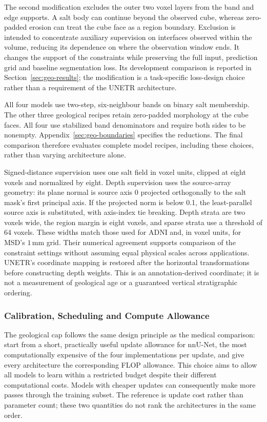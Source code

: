 \documentclass[12pt,a4paper]{article}
\begin{document}
The second modification excludes the outer two voxel layers from the
band and edge supports. A salt body can continue beyond the observed
cube, whereas zero-padded erosion can treat the cube face as a region
boundary. Exclusion is intended to concentrate auxiliary supervision
on interfaces observed within the volume, reducing its dependence on
where the observation window ends. It changes the support of the
constraints while preserving the full input, prediction grid and
baseline segmentation loss. Its development comparison is reported in
Section~\ref{sec:geo-results}; the modification is a task-specific
loss-design choice rather than a requirement of the UNETR architecture.

All four models use two-step, six-neighbour bands on binary salt
membership. The other three geological recipes retain zero-padded
morphology at the cube faces. All four use stabilized band denominators
and require both sides to be nonempty.
Appendix~\ref{sec:geo-boundaries} specifies the reductions. The final
comparison therefore evaluates complete model recipes, including these
choices, rather than varying architecture alone.

Signed-distance supervision uses one salt field in voxel units, clipped
at eight voxels and normalized by eight. Depth supervision uses the
source-array geometry: its plane normal is source axis 0 projected
orthogonally to the salt mask's first principal axis. If the projected
norm is below 0.1, the least-parallel source axis is substituted, with
axis-index tie breaking. Depth strata are two voxels wide, the region
margin is eight voxels, and sparse strata use a threshold of 64 voxels.
These widths match those used for ADNI and, in voxel units, for MSD's
$1\,\mathrm{mm}$ grid. Their numerical agreement supports comparison of
the constraint settings without assuming equal physical scales across
applications.
UNETR's coordinate mapping is restored after the horizontal transformations before
constructing depth weights. This is an annotation-derived coordinate;
it is not a measurement of geological age or a guaranteed vertical
stratigraphic ordering.

\subsubsection{Calibration, Scheduling and Compute Allowance}

The geological cap follows the same design principle as the medical
comparison: start from a short, practically useful update allowance for
nnU-Net, the most computationally expensive of the four implementations
per update, and give every architecture the corresponding FLOP allowance.
This choice aims to allow all models to learn within a restricted budget
despite their different computational costs. Models with cheaper updates
can consequently make more passes through the training subset. The
reference is update cost rather than parameter count; these two quantities
do not rank the architectures in the same order.
\end{document}
